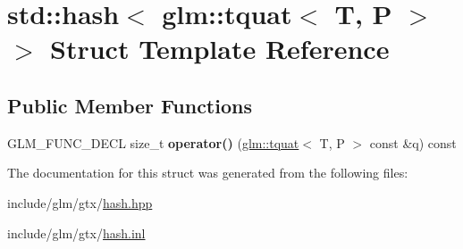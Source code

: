 \hypertarget{structstd_1_1hash_3_01glm_1_1tquat_3_01T_00_01P_01_4_01_4}{}\section{std\+:\+:hash$<$ glm\+:\+:tquat$<$ T, P $>$ $>$ Struct Template Reference}
\label{structstd_1_1hash_3_01glm_1_1tquat_3_01T_00_01P_01_4_01_4}
\subsection*{Public Member Functions}
\begin{DoxyCompactItemize}
\item 
\mbox{\label{structstd_1_1hash_3_01glm_1_1tquat_3_01T_00_01P_01_4_01_4_a0a100f21a2aa8516ecff4f4576f7ebab}} 
G\+L\+M\+\_\+\+F\+U\+N\+C\+\_\+\+D\+E\+CL size\+\_\+t {\bfseries operator()} (\hyperlink{structglm_1_1tquat}{glm\+::tquat}$<$ T, P $>$ const \&q) const
\end{DoxyCompactItemize}


The documentation for this struct was generated from the following files\+:\begin{DoxyCompactItemize}
\item 
include/glm/gtx/\hyperlink{hash_8hpp}{hash.\+hpp}\item 
include/glm/gtx/\hyperlink{hash_8inl}{hash.\+inl}\end{DoxyCompactItemize}
